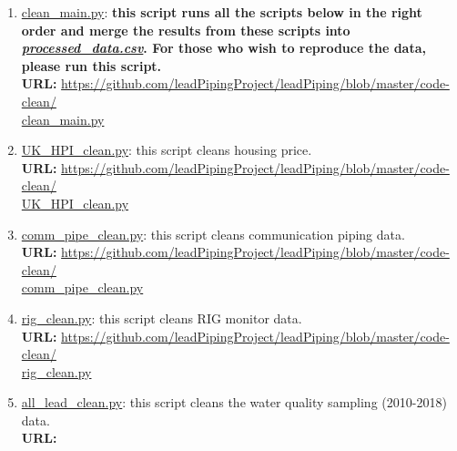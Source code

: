 \documentclass[11pt,twoside]{article}
\numberwithin{Theorem}{section}
\numberwithin{Definition}{section}
\numberwithin{Lemma}{section}
\numberwithin{Algorithm}{section}
\numberwithin{equation}{section}
\begin{document}
\begin{enumerate}
    \item \href{https://github.com/leadPipingProject/leadPiping/blob/master/code-clean/clean_main.py}{clean\_main.py}: \textbf{this script runs all the scripts below in the right order and merge the results from these scripts into \href{https://github.com/leadPipingProject/leadPiping/blob/master/processed-data/processed_data.csv}{\textit{processed\_data.csv}}. For those who wish to reproduce the data, please run this script.}
    \\
    \textbf{URL: }
    \href{https://github.com/leadPipingProject/leadPiping/blob/master/code-clean/clean_main.py}{https://github.com/leadPipingProject/leadPiping/blob/master/code-clean/\\clean\_main.py}
    \item \href{https://github.com/leadPipingProject/leadPiping/blob/master/code-clean/UK_HPI_clean.py}{UK\_HPI\_clean.py}: this script cleans housing price.
    \\
    \textbf{URL: }
    \href{https://github.com/leadPipingProject/leadPiping/blob/master/code-clean/UK_HPI_clean.py}{https://github.com/leadPipingProject/leadPiping/blob/master/code-clean/\\UK\_HPI\_clean.py}
    \item \href{https://github.com/leadPipingProject/leadPiping/blob/master/code-clean/comm_pipe_clean.py}{comm\_pipe\_clean.py}: this script cleans communication piping data.
    \\
    \textbf{URL: }
    \href{https://github.com/leadPipingProject/leadPiping/blob/master/code-clean/comm_pipe_clean.py}{https://github.com/leadPipingProject/leadPiping/blob/master/code-clean/\\comm\_pipe\_clean.py}
    \item \href{https://github.com/leadPipingProject/leadPiping/blob/master/code-clean/rig_clean.py}{rig\_clean.py}: this script cleans RIG monitor data.
    \\
    \textbf{URL: }
    \href{https://github.com/leadPipingProject/leadPiping/blob/master/code-clean/rig_clean.py}{https://github.com/leadPipingProject/leadPiping/blob/master/code-clean/\\rig\_clean.py}
    \item \href{https://github.com/leadPipingProject/leadPiping/blob/master/code-clean/all_lead_clean.py}{all\_lead\_clean.py}: this script cleans the water quality sampling (2010-2018) data.
    \\
    \textbf{URL: }

\end{enumerate}
\end{document}
